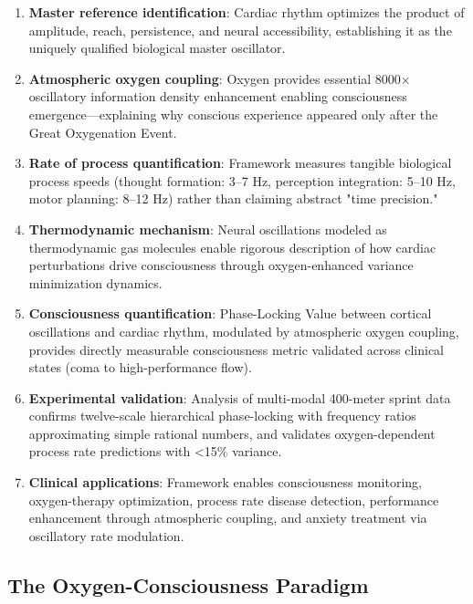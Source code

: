 \documentclass[12pt]{article}
\theoremstyle{remark}
\begin{document}
\begin{enumerate}
\item \textbf{Master reference identification}: Cardiac rhythm optimizes the product of amplitude, reach, persistence, and neural accessibility, establishing it as the uniquely qualified biological master oscillator.

\item \textbf{Atmospheric oxygen coupling}: Oxygen provides essential 8000× oscillatory information density enhancement enabling consciousness emergence—explaining why conscious experience appeared only after the Great Oxygenation Event.

\item \textbf{Rate of process quantification}: Framework measures tangible biological process speeds (thought formation: 3--7 Hz, perception integration: 5--10 Hz, motor planning: 8--12 Hz) rather than claiming abstract "time precision."

\item \textbf{Thermodynamic mechanism}: Neural oscillations modeled as thermodynamic gas molecules enable rigorous description of how cardiac perturbations drive consciousness through oxygen-enhanced variance minimization dynamics.

\item \textbf{Consciousness quantification}: Phase-Locking Value between cortical oscillations and cardiac rhythm, modulated by atmospheric oxygen coupling, provides directly measurable consciousness metric validated across clinical states (coma to high-performance flow).

\item \textbf{Experimental validation}: Analysis of multi-modal 400-meter sprint data confirms twelve-scale hierarchical phase-locking with frequency ratios approximating simple rational numbers, and validates oxygen-dependent process rate predictions with <15\% variance.

\item \textbf{Clinical applications}: Framework enables consciousness monitoring, oxygen-therapy optimization, process rate disease detection, performance enhancement through atmospheric coupling, and anxiety treatment via oscillatory rate modulation.
\end{enumerate}

\subsection{The Oxygen-Consciousness Paradigm}
\end{document}
